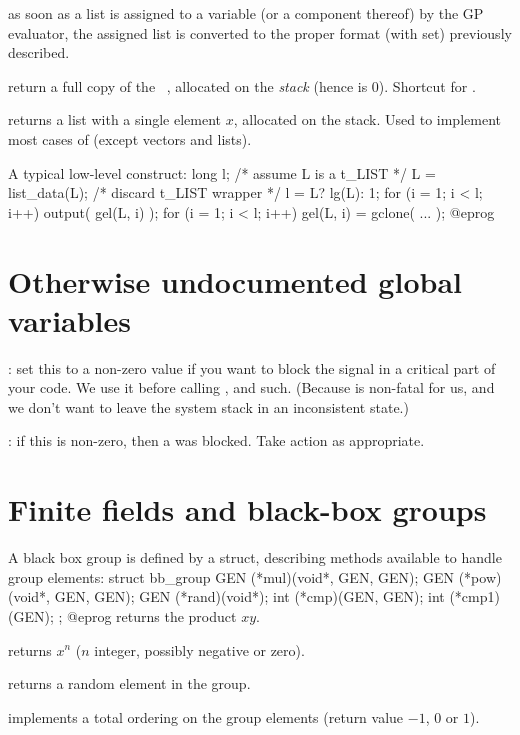 \item as soon as a list is assigned to a variable (or a component thereof)
by the GP evaluator, the assigned list is converted to the proper format
(with  set) previously described. 

 return a full copy of the ~,
allocated on the \emph{stack} (hence  is $0$). Shortcut for
.

 returns a list with a single element $x$,
allocated on the stack. Used to implement most cases of 
(except vectors and lists).

A typical low-level construct:
\bprog
  long l;
  /* assume L is a t_LIST */
  L = list_data(L); /* discard t_LIST wrapper */
  l = L? lg(L): 1;
  for (i = 1; i < l; i++) output( gel(L, i) );
  for (i = 1; i < l; i++) gel(L, i) = gclone( ... );
@eprog\noindent

\section{Otherwise undocumented global variables}

: set this to a non-zero value if you want to block
the  signal in a critical part of your code. We use it
before calling ,  and such. (Because 
is non-fatal for us, and we don't want to leave the system stack in an
inconsistent state.)

: if this is non-zero, then a  was
blocked. Take action as appropriate.

\section{Finite fields and black-box groups}

A black box group is defined by a  struct, describing methods
available to handle group elements:
\bprog
    struct bb_group
    {
      GEN (*mul)(void*, GEN, GEN);
      GEN (*pow)(void*, GEN, GEN);
      GEN (*rand)(void*);
      int (*cmp)(GEN, GEN);
      int (*cmp1)(GEN);
    };
@eprog
 returns the product $xy$.

 returns $x^n$ ($n$ integer, possibly negative or zero).

 returns a random element in the group.

 implements a total ordering on the group elements
(return value $-1$, $0$ or $1$).

